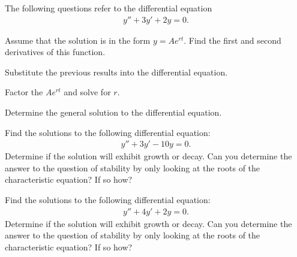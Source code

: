   \begin{problem}

  \item The following questions refer to the  differential
    equation
    \begin{eqnarray*}
      y'' + 3 y' + 2 y = 0.
    \end{eqnarray*}
    \begin{subproblem}
    \item Assume that the solution is in the form $y=Ae^{rt}$. Find
      the first and second derivatives of this function.
      \vfill

    \item Substitute the previous results into the differential equation.
      \vfill
      
    \item Factor the $Ae^{rt}$ and solve for $r$.
      \vfill

    \item Determine the general solution to the differential equation.
      \vfill
    
    \end{subproblem}


 
    \clearpage


  \item Find the solutions to the following differential equation:
    \begin{eqnarray*}
      y'' + 3y' - 10y = 0.
    \end{eqnarray*}
    Determine if the solution will exhibit growth or decay. Can you
    determine the answer to the question of stability by only looking
    at the roots of the characteristic equation? If so how?

    \vfill

  \clearpage


  \item Find the solutions to the following differential equation:
    \begin{eqnarray*}
      y'' + 4y' + 2y = 0.
    \end{eqnarray*}
    Determine if the solution will exhibit growth or decay. Can you
    determine the answer to the question of stability by only looking
    at the roots of the characteristic equation? If so how?

    \vfill
  \end{problem}


